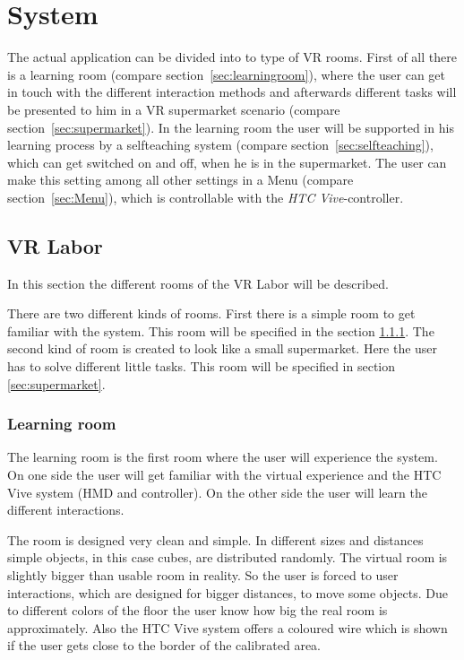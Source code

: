 
\section{System}\label{sec:System}
The actual application can be divided into to type of VR rooms. First of all there is a learning room (compare section~\ref{sec:learningroom}), where the user can get in touch with the different interaction methods and afterwards different tasks will be presented to him in a VR supermarket scenario (compare section~\ref{sec:supermarket}). In the learning room the user will be supported in his learning process by a selfteaching system (compare section~\ref{sec:selfteaching}), which can get switched on and off, when he is in the supermarket. The user can make this setting among all other settings in a Menu  (compare section~\ref{sec:Menu}), which is controllable with the \textit{HTC Vive}-controller. 

\subsection{VR Labor}\label{sec:VRLabor}
In this section the different rooms of the VR Labor will be described. 

There are two different kinds of rooms. First there is a simple room to get familiar with the system. This room will be specified in the section \ref{sec:Learningroom}. The second kind of room is created to look like a small supermarket. Here the user has to solve different little tasks. This room will be specified in section \ref{sec:supermarket}.

\subsubsection{Learning room} \label{sec:Learningroom} %
The learning room is the first room where the user will experience the system. On one side the user will get familiar with the virtual experience and the HTC Vive system (HMD and controller). On the other side the user will learn the different interactions. 

The room is designed very clean and simple. In different sizes and distances simple objects, in this case cubes, are distributed randomly. The virtual room is slightly bigger than usable room in reality. So the user is forced to user interactions, which are designed for bigger distances, to move some objects. Due to different colors of the floor the user know how big the real room is approximately. Also the HTC Vive system offers a coloured wire which is shown if the user gets close to the border of the calibrated area.

